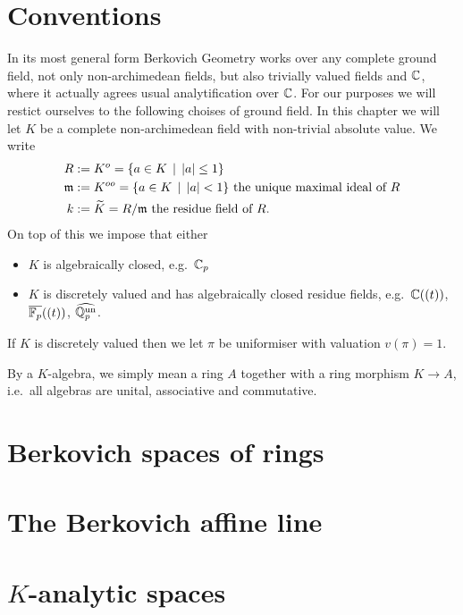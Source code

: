 \section{Conventions} \label{sec:introduction}
In its most general form Berkovich Geometry works over any complete ground field, not only non-archimedean fields, but also trivially valued fields and $\mathbb{C}$, where it actually agrees usual analytification over $\mathbb{C}$. 
For our purposes we will restict ourselves to the following choises of ground field. 
In this chapter we will let $K$ be a complete non-archimedean field with non-trivial absolute value. We write 
\begin{align*}
	R &:= K^{o} = \{a \in K \st |a| \le 1\} \\
	\mathfrak{m}  &:= K^{oo} =  \{a \in K \st |a| < 1\}  \text{ the unique maximal ideal of } R\\
	k &:= \widetilde K = R / \mathfrak{m} \text{ the residue field of } R
.\end{align*}
On top of this we impose that either 
\begin{itemize}
	\item $K$ is algebraically closed, e.g.\ $\mathbb{C}_p$
	\item $K$ is discretely valued and has algebraically closed residue fields, 
		e.g.\ $\mathbb{C}((t))$, $\overline{\mathbb{F}_p}((t))$, $\widehat{\mathbb{Q}_{p}^{\text{un}}}$. 
\end{itemize}
If $K$ is discretely valued then we let $\pi$ be uniformiser with valuation $v(\pi) = 1$.

By a $K$-algebra, we simply mean a ring $A$ together with a ring morphism $K \to A$, i.e.\ all algebras are unital, associative and commutative.  

\section{Berkovich spaces of rings} \label{sec:berkovich_spaces}


\section{The Berkovich affine line} \label{sec:the_berkovich_affine_line}



\section{$K$-analytic spaces} \label{sec:K_analytic_spaces}




